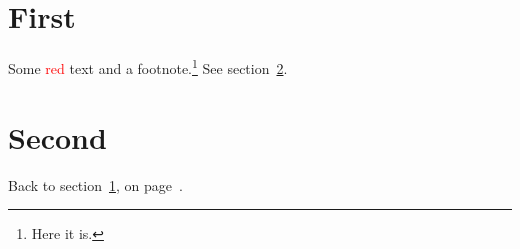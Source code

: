 \documentclass{article}
\begin{document}
\tableofcontents
\section{First}\label{first}
Some \textcolor{red}{red} text and a footnote.\footnote{Here it is.} See section~\ref{second}.
\newpage
\section{Second}\label{second}
Back to section~\ref{first}, on page~\pageref{first}.
\end{document}
